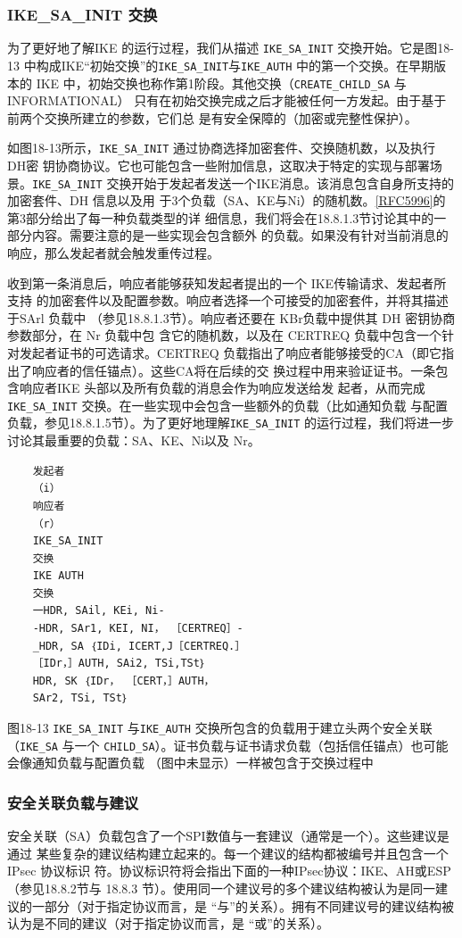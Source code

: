\subsubsection{IKE\_SA\_INIT 交换}
为了更好地了解IKE 的运行过程，我们从描述 \verb|IKE_SA_INIT| 交換开始。它是图18-13
中构成IKE“初始交换”的\verb|IKE_SA_INIT|与\verb|IKE_AUTH| 中的第一个交换。在早期版本的
IKE 中，初始交换也称作第1阶段。其他交换（\verb|CREATE_CHILD_SA| 与 INFORMATIONAL）
只有在初始交换完成之后才能被任何一方发起。由于基于前两个交换所建立的参数，它们总
是有安全保障的（加密或完整性保护）。

如图18-13所示，\verb|IKE_SA_INIT| 通过协商选择加密套件、交换随机数，以及执行 DH密
钥协商协议。它也可能包含一些附加信息，这取决于特定的实现与部署场景。\verb|IKE_SA_INIT|
交换开始于发起者发送一个IKE消息。该消息包含自身所支持的加密套件、DH 信息以及用
于3个负载（SA、KE与Ni）的随机数。\href{https://www.rfc-editor.org/rfc/rfc5996}{[RFC5996]}的第3部分给出了每一种负载类型的详
细信息，我们将会在18.8.1.3节讨论其中的一部分内容。需要注意的是一些实现会包含额外
的负载。如果没有针对当前消息的响应，那么发起者就会触发重传过程。

收到第一条消息后，响应者能够获知发起者提出的一个 IKE传输请求、发起者所支持
的加密套件以及配置参数。响应者选择一个可接受的加密套件，并将其描述于SArl 负载中
（参见18.8.1.3节）。响应者还要在 KBr负载中提供其 DH 密钥协商参数部分，在 Nr 负载中包
含它的随机数，以及在 CERTREQ 负载中包含一个针对发起者证书的可选请求。CERTREQ
负载指出了响应者能够接受的CA（即它指出了响应者的信任锚点）。这些CA将在后续的交
换过程中用来验证证书。一条包含响应者IKE 头部以及所有负载的消息会作为响应发送给发
起者，从而完成\verb|IKE_SA_INIT| 交换。在一些实现中会包含一些额外的负载（比如通知负载
与配置负载，参见18.8.1.5节）。为了更好地理解\verb|IKE_SA_INIT| 的运行过程，我们将进一步
讨论其最重要的负载：SA、KE、Ni以及 Nr。

\begin{verbatim}
    发起者
    （i）
    响应者
    （r）
    IKE_SA_INIT
    交换
    IKE AUTH
    交换
    一HDR, SAil, KEi, Ni-
    -HDR, SAr1, KEI, NI， ［CERTREQ］-
    _HDR, SA ｛IDi, ICERT,J［CERTREQ.］
    ［IDr，］AUTH, SAi2, TSi,TSt｝
    HDR, SK ｛IDr， ［CERT，］AUTH，
    SAr2, TSi, TSt｝
\end{verbatim}
图18-13
\verb|IKE_SA_INIT| 与\verb|IKE_AUTH| 交换所包含的负载用于建立头两个安全关联（\verb|IKE_SA| 与一个
\verb|CHILD_SA|）。证书负载与证书请求负载（包括信任锚点）也可能会像通知负载与配置负载
（图中未显示）一样被包含于交换过程中

\subsubsection{安全关联负载与建议}
安全关联（SA）负载包含了一个SPI数值与一套建议（通常是一个）。这些建议是通过
某些复杂的建议结构建立起来的。每一个建议的结构都被编号并且包含一个 IPsec 协议标识
符。协议标识符将会指出下面的一种IPsec协议：IKE、AH或ESP（参见18.8.2节与 18.8.3
节）。使用同一个建议号的多个建议结构被认为是同一建议的一部分（对于指定协议而言，是
“与”的关系）。拥有不同建议号的建议结构被认为是不同的建议（对于指定协议而言，是
“或”的关系）。


